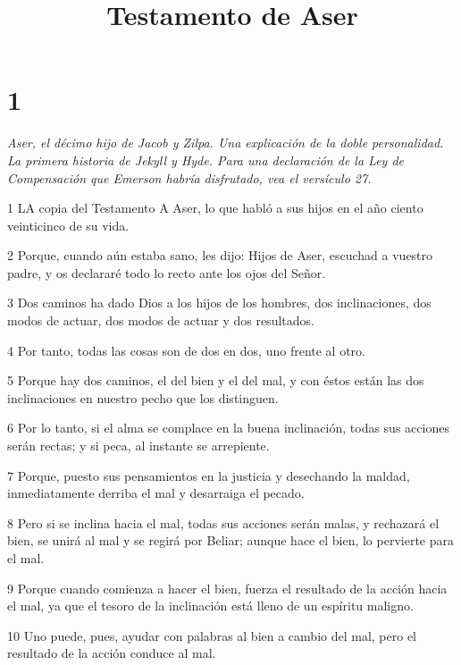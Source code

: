 

\title{Testamento de Aser}

\chapter{1}

\par \textit{Aser, el décimo hijo de Jacob y Zilpa. Una explicación de la doble personalidad. La primera historia de Jekyll y Hyde. Para una declaración de la Ley de Compensación que Emerson habría disfrutado, vea el versículo 27.}

\par 1 LA copia del Testamento A Aser, lo que habló a sus hijos en el año ciento veinticinco de su vida.

\par 2 Porque, cuando aún estaba sano, les dijo: Hijos de Aser, escuchad a vuestro padre, y os declararé todo lo recto ante los ojos del Señor.

\par 3 Dos caminos ha dado Dios a los hijos de los hombres, dos inclinaciones, dos modos de actuar, dos modos de actuar y dos resultados.

\par 4 Por tanto, todas las cosas son de dos en dos, uno frente al otro.

\par 5 Porque hay dos caminos, el del bien y el del mal, y con éstos están las dos inclinaciones en nuestro pecho que los distinguen.

\par 6 Por lo tanto, si el alma se complace en la buena inclinación, todas sus acciones serán rectas; y si peca, al instante se arrepiente.

\par 7 Porque, puesto sus pensamientos en la justicia y desechando la maldad, inmediatamente derriba el mal y desarraiga el pecado.

\par 8 Pero si se inclina hacia el mal, todas sus acciones serán malas, y rechazará el bien, se unirá al mal y se regirá por Beliar; aunque hace el bien, lo pervierte para el mal.

\par 9 Porque cuando comienza a hacer el bien, fuerza el resultado de la acción hacia el mal, ya que el tesoro de la inclinación está lleno de un espíritu maligno.

\par 10 Uno puede, pues, ayudar con palabras al bien a cambio del mal, pero el resultado de la acción conduce al mal.

